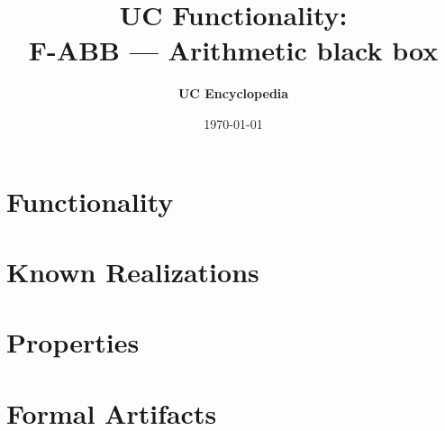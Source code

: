 \documentclass[11pt,a4paper]{article}
\title{\textbf{\Large UC Functionality:}\\[0.2em] \Large F-ABB --- Arithmetic black box}
\author{\textbf{UC Encyclopedia}}
\date{\today}
\newtheorem{functionality}{Functionality}
\begin{document}
\maketitle

\begin{abstract}
\end{abstract}

\section{Functionality}

%

\section{Known Realizations}


\section{Properties}


\section{Formal Artifacts}

\end{document}
